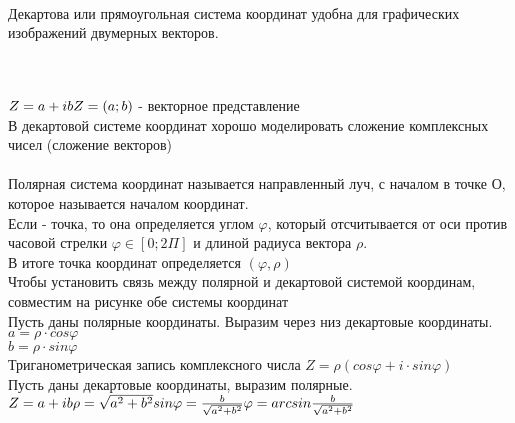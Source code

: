 \begin{center}
 \\
\end{center}

Декартова или прямоугольная система координат удобна для графических изображений
двумерных векторов. \\
 \\
 \\


$Z = a + ib \\
Z = (a; b)$ - векторное представление \\
В декартовой системе координат хорошо моделировать сложение комплексных чисел 
(сложение векторов) \\

 \\
Полярная система координат называется направленный луч, с началом в точке \kv 
{О}, которое называется началом координат. \\
Если  - точка, то она определяется углом $\varphi$, который 
отсчитывается от оси против часовой стрелки $\varphi \in [0; 2 \Pi]$ и длиной 
радиуса вектора $\rho$. \\
В итоге точка координат определяется $(\varphi, \rho)$ \\

Чтобы установить связь между полярной и декартовой системой координам, 
совместим на рисунке обе системы координат \\

Пусть даны полярные координаты. Выразим через низ декартовые координаты. \\
$a = \rho \cdot cos\varphi$ \\
$b = \rho \cdot sin\varphi$ \\
Триганометрическая запись комплексного числа $Z = \rho (cos\varphi + i \cdot sin
\varphi)$ \\
Пусть даны декартовые координаты, выразим полярные. \\
$Z = a + ib \\
\rho = \sqrt{a^2 + b^2} \\
sin \varphi = \frac {b}{\sqrt{a^2 + b^2}} \\
\varphi = arcsin \frac {b}{\sqrt{a^2 + b^2}}$ \\


